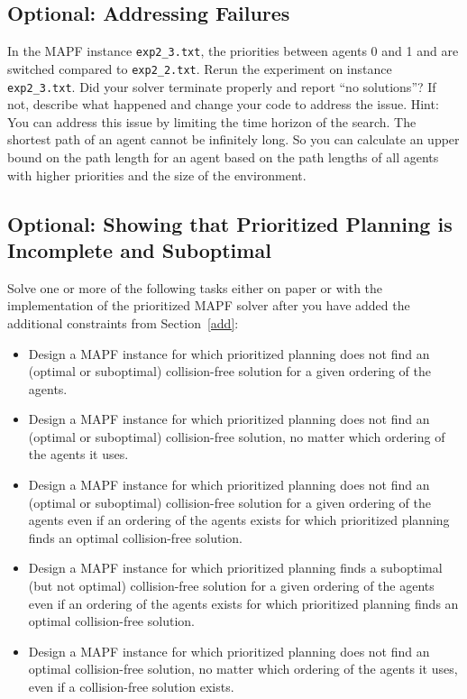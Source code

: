 \documentclass[11pt]{article}
\begin{document}
\subsection{Optional: Addressing Failures}

In the MAPF instance \texttt{exp2\_3.txt}, the priorities between agents 0 and 1 and are switched compared to \texttt{exp2\_2.txt}. Rerun the experiment on instance \texttt{exp2\_3.txt}. Did your solver terminate properly and report ``no solutions''? If not, describe what happened and change your code to address the issue. Hint: You can address this issue by limiting the time horizon of the search. The shortest path of an agent cannot be infinitely long. So you can calculate an upper bound on the path length for an agent based on the path lengths of all agents with higher priorities and the size of the environment.

\subsection{Optional: Showing that Prioritized Planning is Incomplete and Suboptimal}

Solve one or more of the following tasks either on paper or with the implementation of the prioritized MAPF solver after you have added the additional constraints from Section~\ref{add}:

\begin{itemize}

\item Design a MAPF instance for which prioritized planning does not find an (optimal or suboptimal) collision-free solution for a given ordering of the agents. 

\item Design a MAPF instance for which prioritized planning does not find an (optimal or suboptimal) collision-free solution, no matter which ordering of the agents it uses. 

\item Design a MAPF instance for which prioritized planning does not find an (optimal or suboptimal) collision-free solution for a given ordering of the agents even if an ordering of the agents exists for which prioritized planning finds an optimal collision-free solution. 

\item Design a MAPF instance for which prioritized planning finds a suboptimal (but not optimal) collision-free solution for a given ordering of the agents even if an ordering of the agents exists for which prioritized planning finds an optimal collision-free solution. 

\item Design a MAPF instance for which prioritized planning does not find an optimal collision-free solution, no matter which ordering of the agents it uses, even if a collision-free solution exists.

\end{itemize}
\end{document}
